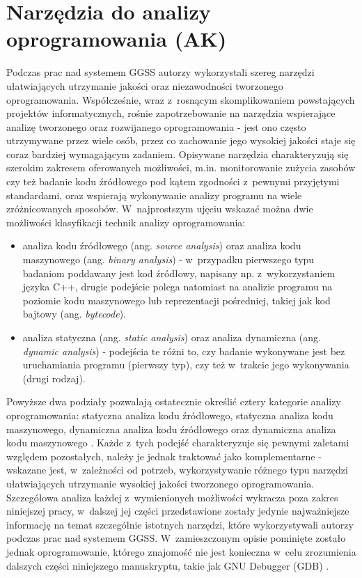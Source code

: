 \section{Narzędzia do analizy oprogramowania (AK)}
Podczas prac nad systemem GGSS autorzy wykorzystali szereg narzędzi ułatwiających utrzymanie jakości oraz niezawodności tworzonego oprogramowania. Współcześnie, wraz z~rosnącym skomplikowaniem powstających projektów informatycznych, rośnie zapotrzebowanie na narzędzia wspierające analizę tworzonego oraz rozwijanego oprogramowania - jest ono często utrzymywane przez wiele osób, przez co zachowanie jego wysokiej jakości staje się coraz bardziej wymagającym zadaniem. Opisywane narzędzia charakteryzują się szerokim zakresem oferowanych możliwości, m.in. monitorowanie zużycia zasobów czy też badanie kodu źródłowego pod kątem zgodności z~pewnymi przyjętymi standardami, oraz wspierają wykonywanie analizy programu na wiele zróżnicowanych sposobów. W~najprostszym ujęciu wskazać można dwie możliwości klasyfikacji technik analizy oprogramowania:
\begin{itemize}
    \item analiza kodu źródłowego (ang. \emph{source analysis}) oraz analiza kodu maszynowego (ang. \emph{binary analysis}) - w~przypadku pierwszego typu badaniom poddawany jest kod źródłowy, napisany np. z~wykorzystaniem języka C++, drugie podejście polega natomiast na analizie programu na poziomie kodu maszynowego lub reprezentacji pośredniej, takiej jak kod bajtowy (ang. \emph{bytecode}).
    \item analiza statyczna (ang. \emph{static analysis}) oraz analiza dynamiczna (ang. \emph{dynamic analysis}) - podejścia te różni to, czy badanie wykonywane jest bez uruchamiania programu (pierwszy typ), czy też w~trakcie jego wykonywania (drugi rodzaj).
\end{itemize}

Powyższe dwa podziały pozwalają ostatecznie określić cztery kategorie analizy oprogramowania: statyczna analiza kodu źródłowego, statyczna analiza kodu maszynowego, dynamiczna analiza kodu źródłowego oraz dynamiczna analiza kodu maszynowego \cite{code_analysis}. Każde z~tych podejść charakteryzuje się pewnymi zaletami względem pozostałych, należy je jednak traktować jako komplementarne - wskazane jest, w~zależności od potrzeb, wykorzystywanie różnego typu narzędzi ułatwiających utrzymanie wysokiej jakości tworzonego oprogramowania. Szczegółowa analiza każdej z~wymienionych możliwości wykracza poza zakres niniejszej pracy, w~dalszej jej części przedstawione zostały jedynie najważniejsze informację na temat szczególnie istotnych narzędzi, które wykorzystywali autorzy podczas prac nad systemem GGSS. W~zamieszczonym opisie pominięte zostało jednak oprogramowanie, którego znajomość nie jest konieczna w~celu zrozumienia dalszych części niniejszego manuskryptu, takie jak GNU Debugger (GDB) \cite{gdb}.

